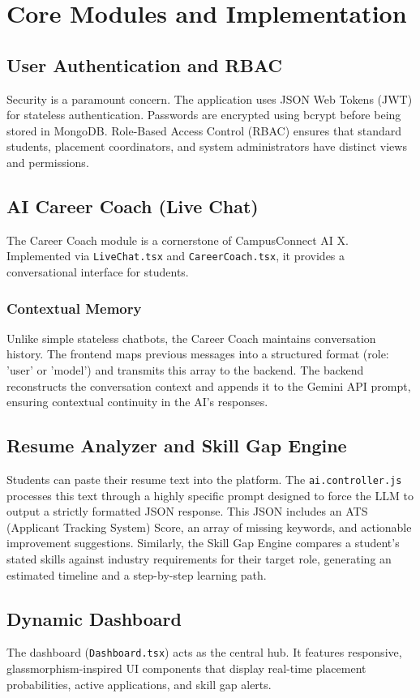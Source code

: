 \documentclass[12pt,a4paper]{report}
\begin{document}
\chapter{Core Modules and Implementation}

\section{User Authentication and RBAC}
Security is a paramount concern. The application uses JSON Web Tokens (JWT) for stateless authentication. Passwords are encrypted using bcrypt before being stored in MongoDB. Role-Based Access Control (RBAC) ensures that standard students, placement coordinators, and system administrators have distinct views and permissions.

\section{AI Career Coach (Live Chat)}
The Career Coach module is a cornerstone of CampusConnect AI X. Implemented via \texttt{LiveChat.tsx} and \texttt{CareerCoach.tsx}, it provides a conversational interface for students.
\subsection{Contextual Memory}
Unlike simple stateless chatbots, the Career Coach maintains conversation history. The frontend maps previous messages into a structured format (role: 'user' or 'model') and transmits this array to the backend. The backend reconstructs the conversation context and appends it to the Gemini API prompt, ensuring contextual continuity in the AI's responses.

\section{Resume Analyzer and Skill Gap Engine}
Students can paste their resume text into the platform. The \texttt{ai.controller.js} processes this text through a highly specific prompt designed to force the LLM to output a strictly formatted JSON response. This JSON includes an ATS (Applicant Tracking System) Score, an array of missing keywords, and actionable improvement suggestions.
Similarly, the Skill Gap Engine compares a student's stated skills against industry requirements for their target role, generating an estimated timeline and a step-by-step learning path.

\section{Dynamic Dashboard}
The dashboard (\texttt{Dashboard.tsx}) acts as the central hub. It features responsive, glassmorphism-inspired UI components that display real-time placement probabilities, active applications, and skill gap alerts. 
\end{document}
